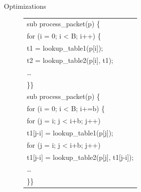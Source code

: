 \documentclass[final]{beamer}
\newlength{\sepwid}
\newlength{\onecolwid}
\newlength{\twocolwid}
\begin{document}
\begin{frame}
\begin{columns}[t]
\begin{column}{\twocolwid}
\begin{exampleblock}{Optimizations}
\begin{multicols}{3}
\begin{figure}[ht]
\begin{small}
\begin{tabular}[b]{p{\onecolwid}}
sub{ process\_packet}(p) \{ \\
\hspace{0.2\sepwid}for (i = 0; i < B; i++) \{ \\
\hspace{0.4\sepwid}t1 = lookup\_table1(p[i]); \\
\hspace{0.4\sepwid}t2 = lookup\_table2(p[i], t1); \\
\hspace{0.4\sepwid}\ldots\\
\hspace{0.2\sepwid}\}\hspace{0.2\sepwid}\}\\
sub {process\_packet}(p) \{\\
\hspace{0.2\sepwid}for (i = 0; i < B; i+=b) \{\\
\hspace{0.4\sepwid}for (j = i; j < i+b; j++)\\
\hspace{0.6\sepwid}t1[j-i] = lookup\_table1(p[j]);\\
\hspace{0.4\sepwid}for (j = i; j < i+b; j++)\\
\hspace{0.6\sepwid}t1[j-i] = lookup\_table2(p[j], t1[j-i]);\\
\hspace{0.4\sepwid}\ldots\\
\hspace{0.2\sepwid}\}\hspace{0.2\sepwid}\}\\

\end{tabular}
\end{small}
\end{figure}



\end{multicols}
\end{exampleblock}
\end{column}
\end{columns}
\end{frame}
\end{document}
